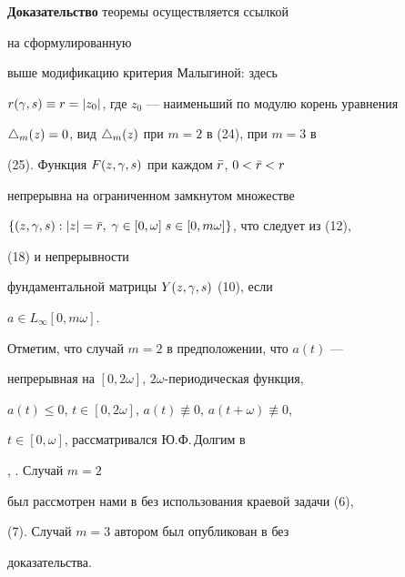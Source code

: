 {\bf Доказательство} теоремы осуществляется ссылкой


на сформулированную


выше модификацию критерия Малыгиной: здесь


$r(\gamma,s)\equiv r=|z_0|$, где $z_0$ --- наименьший по модулю корень уравнения


$\triangle_m(z)=0$, вид $\triangle_m(z)$ при $m=2$ в (24), при $m=3$ в


(25). Функция $F(z,\gamma,s)$ при каждом $\Bar r$, $0<\Bar r<r$


непрерывна на ограниченном замкнутом множестве


$\{(z,\g,s):|z|=\Bar r,\; \g\in[0,\omega]\;


s\in[0,m\omega]\}$, что следует из (12),


(18) и непрерывности


фундаментальной матрицы $Y(z,\gamma,s)$ (10), если


$a\in L_\infty[0,m\omega]$.





Отметим, что случай $m=2$ в предположении, что $a(t)$ ---


непрерывная на $[0,2\omega]$, $2\omega$-периодическая функция,


$a(t)\le0$, $t\in[0,2\omega]$, $a(t)\not\equiv0$, $a(t+\omega)\not\equiv0$,


$t\in[0,\omega]$, рассматривался Ю.Ф.\,Долгим в


\cite{Do1}, \cite{Do2}. Случай $m=2$


был рассмотрен нами в \cite{Sed1} без использования краевой задачи (6),


(7). Случай $m=3$ автором был опубликован в \cite{Sed2} без


доказательства.








